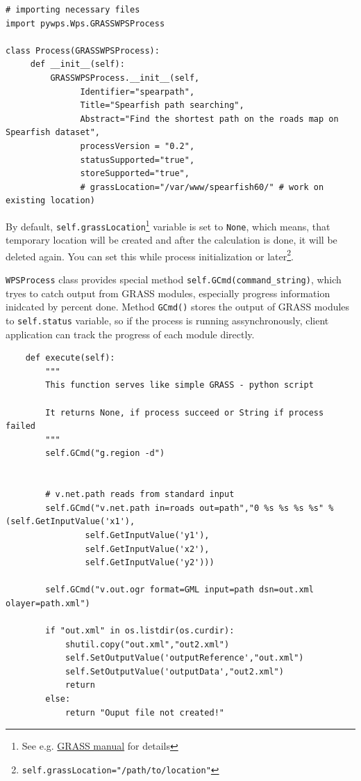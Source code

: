 \documentclass[a4paper,11pt]{article}
\begin{document}
\begin{verbatim}
# importing necessary files
import pywps.Wps.GRASSWPSProcess

class Process(GRASSWPSProcess):
     def __init__(self):
         GRASSWPSProcess.__init__(self,
               Identifier="spearpath",
               Title="Spearfish path searching",
               Abstract="Find the shortest path on the roads map on Spearfish dataset",
               processVersion = "0.2",
               statusSupported="true",
               storeSupported="true",
               # grassLocation="/var/www/spearfish60/" # work on existing location)
\end{verbatim}

By default, \texttt{self.grassLocation}\footnote{See e.g.
\href{http://grass.itc.it/grass63/manuals/html63\_user/helptext.html}{GRASS
manual} for details} 
 variable is set to \texttt{None},
which means, that temporary location will be created and after the
calculation is done, it will be deleted again. You can set this while
process initialization or
later\footnote{\texttt{self.grassLocation="/path/to/location"}}.

    
\texttt{WPSProcess} class provides special method
\texttt{self.GCmd(command\_string)}, which tryes to catch output from GRASS
modules, especially progress information inidcated by percent done. Method
\texttt{GCmd()} stores the output of GRASS modules to \texttt{self.status}
variable, so if the process is running assynchronously, client application
can track the progress of each module directly.

\begin{verbatim}
    def execute(self):
        """
        This function serves like simple GRASS - python script

        It returns None, if process succeed or String if process failed
        """
        self.GCmd("g.region -d")


        # v.net.path reads from standard input
        self.GCmd("v.net.path in=roads out=path","0 %s %s %s %s" % (self.GetInputValue('x1'),
                self.GetInputValue('y1'),
                self.GetInputValue('x2'),
                self.GetInputValue('y2')))

        self.GCmd("v.out.ogr format=GML input=path dsn=out.xml olayer=path.xml")

        if "out.xml" in os.listdir(os.curdir):
            shutil.copy("out.xml","out2.xml")
            self.SetOutputValue('outputReference',"out.xml")
            self.SetOutputValue('outputData',"out2.xml")
            return
        else:
            return "Ouput file not created!"
\end{verbatim}
\end{document}
